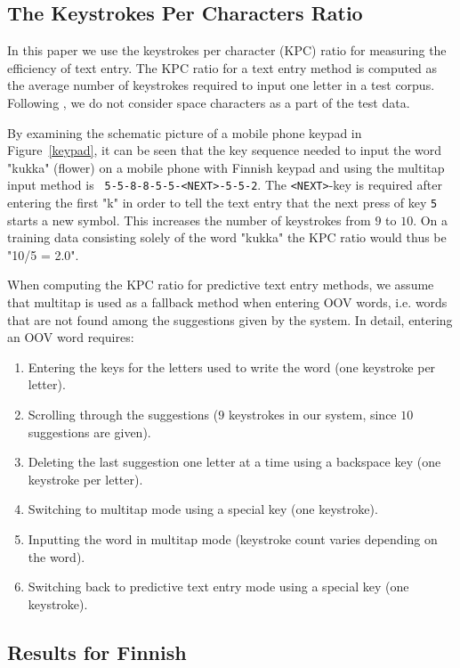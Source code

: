 \documentclass{llncs}
\begin{document}
\subsection{The Keystrokes Per Characters Ratio}

In this paper we use the keystrokes per character (KPC)
ratio for measuring the efficiency of text
entry. The KPC ratio for a text entry method is computed as the
average number of keystrokes required to input one letter in a test
corpus. Following \cite{Tantug:2010}, we do not consider space
characters as a part of the test data.

By examining the schematic picture of a mobile phone keypad in
Figure~\ref{keypad}, it can be seen that the key sequence needed to
input the word "kukka" (flower) on a mobile phone with Finnish keypad
and using the multitap input method is {\tt
  5-5-8-8-5-5-<NEXT>-5-5-2}. The {\tt <NEXT>}-key is required after
entering the first "k" in order to tell the text entry that the next
press of key {\tt 5} starts a new symbol. This increases the number of
keystrokes from $9$ to $10$. On a training data consisting solely of
the word "kukka" the KPC ratio would thus be "10/5 = 2.0".


When computing the KPC ratio for predictive text entry methods, we assume
that multitap is used as a fallback method when entering OOV words,
i.e. words that are not found among the suggestions given by the
system. In detail, entering an OOV word requires:
\begin{enumerate}
\item Entering the keys for the letters used to write the word (one
  keystroke per letter).
\item Scrolling through the suggestions ($9$ keystrokes in our system,
  since $10$ suggestions are given).
\item Deleting the last suggestion one letter at a time using a
  backspace key (one keystroke per letter).
\item Switching to multitap mode using a special key (one
  keystroke).
\item Inputting the word in multitap mode (keystroke count varies
  depending on the word).
\item Switching back to predictive text entry mode using a special key (one keystroke).
\end{enumerate}

\subsection{Results for Finnish}
\end{document}
